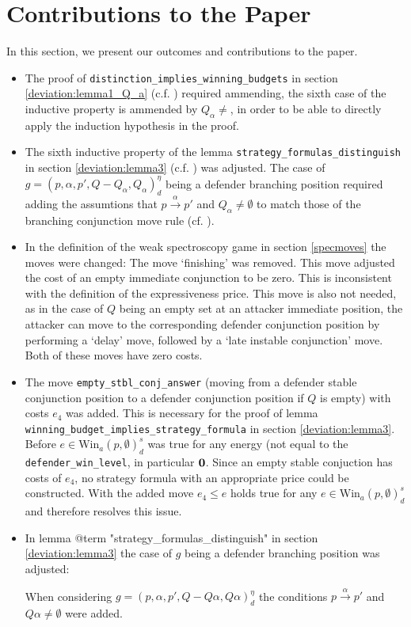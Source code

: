 \newpage
\section{Contributions to the Paper}
In this section, we present our outcomes and contributions to the paper.
\begin{itemize}
    \item The proof of \texttt{distinction\_implies\_winning\_budgets} in section \ref{deviation:lemma1_Q_a} 
    (c.f. \cite[lemma $1$]{bisping2023lineartimebranchingtime}) required ammending, the sixth case
    of the inductive property is ammended by $Q_\alpha \neq {}$, in order to be able to directly
    apply the induction hypothesis in the proof.

    \item The sixth inductive property of the lemma \texttt{strategy\_formulas\_distinguish} in section \ref{deviation:lemma3} 
    (c.f. \cite[lemma $3$]{bisping2023lineartimebranchingtime}) was adjusted.
    The case of $g=(p,\alpha ,p', Q- Q_\alpha, Q_\alpha)_d^\eta$ being a defender branching position
    required adding the assumtions that $p \overset{\alpha}{\longrightarrow} p'$ and $Q_\alpha \neq \emptyset$
    to match those of the branching conjunction move rule (cf. \cite[p. 13]{bisping2023lineartimebranchingtime}). 

    \item In the definition of the weak spectroscopy game in section \ref{specmoves} the moves were changed: 
    The move `finishing' was removed. This move adjusted the cost of an empty immediate conjunction to be zero.
    This is inconsistent with the definition of the expressiveness price. This move is also not needed, as in the case of $Q$ being an empty set at an attacker immediate position, the attacker can move to the corresponding
    defender conjunction position by performing a `delay' move, followed by a `late instable conjunction' move. Both of these moves have zero costs.

    \item The move \texttt{empty\_stbl\_conj\_answer} (moving from a defender stable conjunction position to a defender conjunction
    position if $Q$ is empty) with costs $e_4$ was added. This is necessary for the proof of lemma\\ 
    \texttt{winning\_budget\_implies\_strategy\_formula} in section \ref{deviation:lemma3}. Before 
    $e \in \text{Win}_a (p, \emptyset)_d^s $ was true for any energy (not equal to the \texttt{defender\_win\_level}, in particular $\bold{0}$. 
    Since an empty stable conjuction has costs of $e_4$, no strategy formula with an appropriate price could be constructed. 
    With the added move $e_4 \leq e $ holds true for any $e \in \text{Win}_a (p, \emptyset)_d^s $ and therefore resolves this issue.

    \item In lemma @{term "strategy\_formulas\_distinguish"} in section \ref{deviation:lemma3} the case of $g$ being a defender branching position was adjusted: 
    
    When considering $g=(p,\alpha ,p', Q- Q \alpha, Q \alpha)_d^\eta$ the conditions $p \overset{\alpha}{\longrightarrow} p'$ and $Q \alpha \neq \emptyset$ were added. 
\end{itemize}
